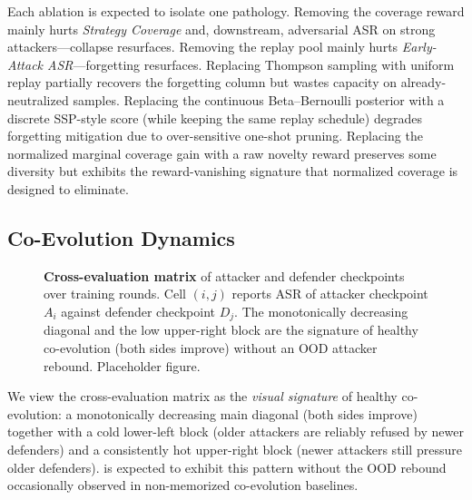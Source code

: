 Each ablation is expected to isolate one pathology. Removing the coverage reward mainly hurts \emph{Strategy Coverage} and, downstream, adversarial ASR on strong attackers---collapse resurfaces. Removing the replay pool mainly hurts \emph{Early-Attack ASR}---forgetting resurfaces. Replacing Thompson sampling with uniform replay partially recovers the forgetting column but wastes capacity on already-neutralized samples. Replacing the continuous Beta--Bernoulli posterior with a discrete SSP-style score (while keeping the same replay schedule) degrades forgetting mitigation due to over-sensitive one-shot pruning. Replacing the normalized marginal coverage gain with a raw novelty reward preserves some diversity but exhibits the reward-vanishing signature that normalized coverage is designed to eliminate.

\subsection{Co-Evolution Dynamics}
\label{sec:exp-coevolve}

\begin{figure}[t]
  \centering
  \fbox{\rule[-2.3cm]{0pt}{4.6cm}\rule[-2.3cm]{0.95\linewidth}{0pt}}
  \caption{\textbf{Cross-evaluation matrix} of attacker and defender checkpoints over training rounds. Cell $(i,j)$ reports ASR of attacker checkpoint $A_i$ against defender checkpoint $D_j$. The monotonically decreasing diagonal and the low upper-right block are the signature of healthy co-evolution (both sides improve) without an OOD attacker rebound. Placeholder figure.}
  \label{fig:coevolution-matrix}
\end{figure}

We view the cross-evaluation matrix as the \emph{visual signature} of healthy co-evolution: a monotonically decreasing main diagonal (both sides improve) together with a cold lower-left block (older attackers are reliably refused by newer defenders) and a consistently hot upper-right block (newer attackers still pressure older defenders). \method is expected to exhibit this pattern without the OOD rebound occasionally observed in non-memorized co-evolution baselines.
